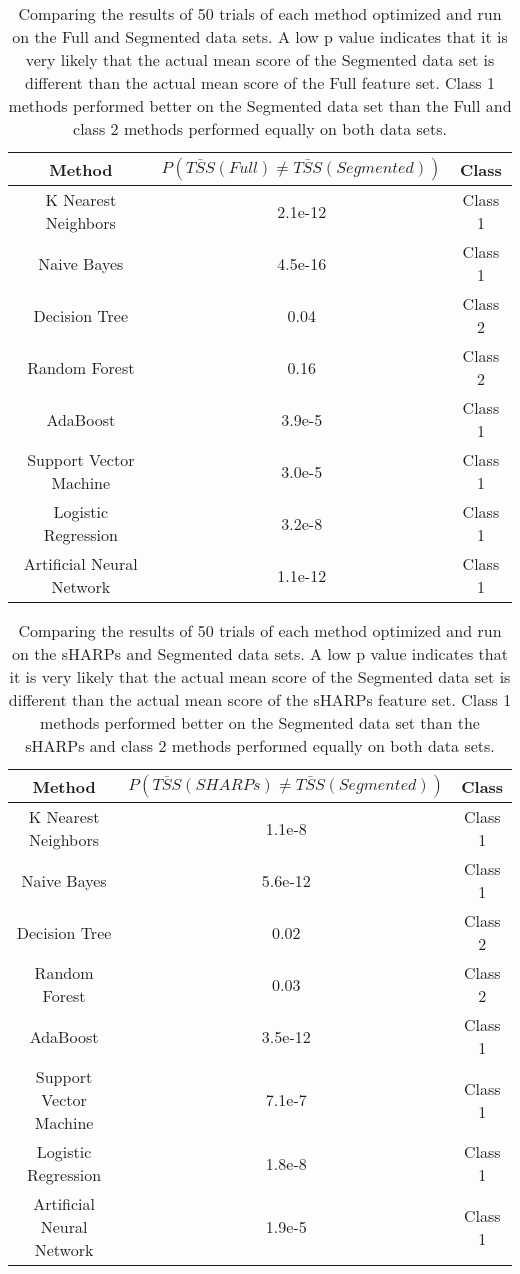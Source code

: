 \begin{table}
\begin{center}
\begin{tabular}{c|c|c}
     Method & $P(\bar{TSS}(Full) \neq \bar{TSS}(Segmented))$ & Class \\
     \hline
     K Nearest Neighbors & 2.1e-12 & Class 1 \\
     Naive Bayes & 4.5e-16 & Class 1 \\
     Decision Tree & 0.04 & Class 2 \\
     Random Forest & 0.16 & Class 2 \\
     AdaBoost & 3.9e-5 & Class 1 \\
     Support Vector Machine & 3.0e-5 & Class 1 \\
     Logistic Regression & 3.2e-8 & Class 1 \\
     Artificial Neural Network & 1.1e-12 & Class 1
\end{tabular}
\caption{Comparing the results of 50 trials of each method optimized and run on the Full and Segmented data sets. A low p value indicates that it is very likely that the actual mean score of the Segmented data set is different than the actual mean score of the Full feature set. Class 1 methods performed better on the Segmented data set than the Full and class 2 methods performed equally on both data sets.} 
\label{tbl:bsseg}
\end{center}
\end{table}

\begin{table}[H]
\begin{center}
\begin{tabular}{c|c|c}
     Method & $P(\bar{TSS}(SHARPs) \neq \bar{TSS}(Segmented))$ & Class \\
     \hline
     K Nearest Neighbors & 1.1e-8 & Class 1 \\
     Naive Bayes & 5.6e-12 & Class 1 \\
     Decision Tree & 0.02 & Class 2 \\
     Random Forest & 0.03 & Class 2 \\
     AdaBoost & 3.5e-12 & Class 1 \\
     Support Vector Machine & 7.1e-7 & Class 1 \\
     Logistic Regression & 1.8e-8 & Class 1 \\
     Artificial Neural Network & 1.9e-5 & Class 1
\end{tabular}
\caption{Comparing the results of 50 trials of each method optimized and run on the sHARPs and Segmented data sets. A low p value indicates that it is very likely that the actual mean score of the Segmented data set is different than the actual mean score of the sHARPs feature set. Class 1 methods performed better on the Segmented data set than the sHARPs and class 2 methods performed equally on both data sets.} 
\label{tbl:shpseg}
\end{center}
\end{table}

